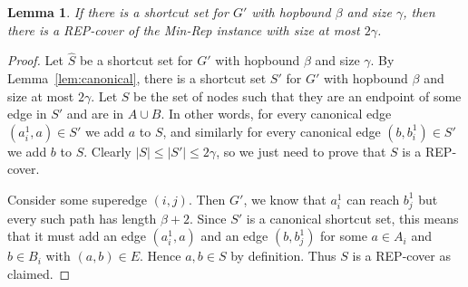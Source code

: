 \documentclass{article}
\newtheorem{lemma}[theorem]{Lemma}
\theoremstyle{definition}
\theoremstyle{remark}
\begin{document}
\begin{lemma} \label{lem:soundness}
    If there is a shortcut set for $G'$ with hopbound $\beta$ and size $\gamma$, then there is a REP-cover of the Min-Rep instance with size at most $2\gamma$.
\end{lemma}
\begin{proof}
    Let $\hat S$ be a shortcut set for $G'$ with hopbound $\beta$ and size $\gamma$.  By Lemma~\ref{lem:canonical}, there is a shortcut set $S'$ for $G'$ with hopbound $\beta$ and size at most $2\gamma$.  Let $S$ be the set of nodes such that they are an endpoint of some edge in $S'$ and are in $A \cup B$.  In other words, for every canonical edge $(a_i^1, a) \in S'$ we add $a$ to $S$, and similarly for every canonical edge $(b, b_i^1) \in S'$ we add $b$ to $S$.  Clearly $|S| \leq |S'| \leq 2\gamma$, so we just need to prove that $S$ is a REP-cover.

    Consider some superedge $(i,j)$.  Then $G'$, we know that $a_i^1$ can reach $b_j^1$ but every such path has length $\beta+2$.  Since $S'$ is a canonical shortcut set, this means that it must add an edge $(a_i^1, a)$ and an edge $(b, b_j^1)$ for some $a \in A_i$ and $b \in B_i$ with $(a,b) \in E$.  Hence $a,b \in S$ by definition.  Thus $S$ is a REP-cover as claimed.  
\end{proof} \else 
\fi









\iflong \else

\appendix

\setcounter{equation}{0}
\renewcommand{\theequation}{\thesection.\arabic{equation}}
\setcounter{theorem}{0}
\renewcommand{\thetheorem}{\thesection.\arabic{theorem}}
\setcounter{algocf}{0}
\renewcommand{\thealgocf}{\thesection.\arabic{algocf}}


\fi
\end{document}
